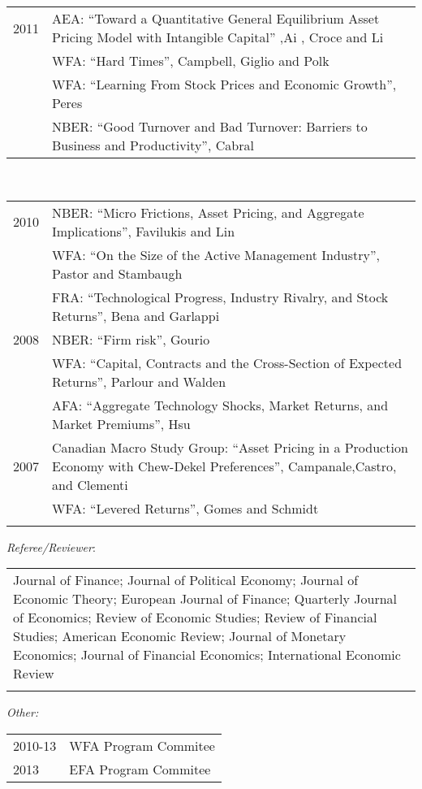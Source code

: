 \documentclass[11pt,a4paper,sans]{moderncv}
\begin{document}
\begin{resume}
\begin{itemize}
\begin{tabular}{lp{12cm}}
  2011 & AEA: ``Toward a Quantitative General Equilibrium Asset Pricing Model with Intangible Capital'' ,Ai , Croce and Li \\[0.2cm]
       & WFA: ``Hard Times'', Campbell, Giglio and Polk\\[0.2cm]
       & WFA: ``Learning From Stock Prices and Economic Growth'', Peres\\[0.2cm]

       & NBER: ``Good Turnover and Bad Turnover: Barriers to Business and Productivity'', Cabral\\[0.2cm]
               \end{tabular}
               \\
\begin{tabular}{lp{12cm}}
  2010 & NBER: ``Micro Frictions, Asset Pricing, and Aggregate Implications'', Favilukis and  Lin \\[0.2cm]
       & WFA: ``On the Size of the Active Management Industry'', Pastor and  Stambaugh\\[0.2cm]
       & FRA: ``Technological Progress, Industry Rivalry, and Stock Returns'', Bena and Garlappi\\[0.2cm]
  2008 & NBER: ``Firm risk'', Gourio \\[0.2cm]
       & WFA: ``Capital, Contracts and the Cross-Section of Expected Returns'', Parlour and Walden\\[0.2cm]
       & AFA: ``Aggregate Technology Shocks, Market Returns, and Market Premiums'', Hsu\\[0.2cm]
  2007 & Canadian Macro Study Group:  ``Asset Pricing in a Production Economy with Chew-Dekel Preferences'', Campanale,Castro, and Clementi         \\[0.2cm]
       & WFA: ``Levered Returns'', Gomes and Schmidt                          \\ \\
  \end{tabular}

\emph{Referee/Reviewer}:\\

 \begin{tabular}{p{14cm}}
Journal of Finance; Journal of Political Economy; Journal of Economic Theory; European Journal of Finance; Quarterly Journal of Economics; Review of Economic Studies; Review of Financial Studies; American Economic Review;  Journal of Monetary Economics; Journal of Financial Economics; International Economic Review\\\\
 \end{tabular}

\emph{Other:}\\

  \begin{tabular}{ll}
 2010-13 & WFA Program Commitee\\
  2013 & EFA Program Commitee\\
 \end{tabular}

\end{itemize}



\end{resume}
\end{document}
